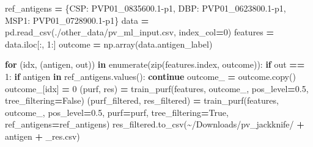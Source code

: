 \documentclass[
  11pt,
  oneside]{book}
\newenvironment{Shaded}{\begin{snugshade}}{\end{snugshade}}
\newcommand{\BuiltInTok}[1]{#1}
\newcommand{\ControlFlowTok}[1]{\textcolor[rgb]{0.13,0.29,0.53}{\textbf{#1}}}
\newcommand{\DecValTok}[1]{\textcolor[rgb]{0.00,0.00,0.81}{#1}}
\newcommand{\FloatTok}[1]{\textcolor[rgb]{0.00,0.00,0.81}{#1}}
\newcommand{\KeywordTok}[1]{\textcolor[rgb]{0.13,0.29,0.53}{\textbf{#1}}}
\newcommand{\NormalTok}[1]{#1}
\newcommand{\OperatorTok}[1]{\textcolor[rgb]{0.81,0.36,0.00}{\textbf{#1}}}
\newcommand{\StringTok}[1]{\textcolor[rgb]{0.31,0.60,0.02}{#1}}
\newcommand{\VariableTok}[1]{\textcolor[rgb]{0.00,0.00,0.00}{#1}}
\begin{document}
\begin{Shaded}
\begin{Highlighting}[]
\NormalTok{ref\_antigens }\OperatorTok{=}\NormalTok{ \{}\StringTok{\textquotesingle{}CSP\textquotesingle{}}\NormalTok{: }\StringTok{\textquotesingle{}PVP01\_0835600.1{-}p1\textquotesingle{}}\NormalTok{, }\StringTok{\textquotesingle{}DBP\textquotesingle{}}\NormalTok{: }\StringTok{\textquotesingle{}PVP01\_0623800.1{-}p1\textquotesingle{}}\NormalTok{, }\StringTok{\textquotesingle{}MSP1\textquotesingle{}}\NormalTok{: }\StringTok{\textquotesingle{}PVP01\_0728900.1{-}p1\textquotesingle{}}\NormalTok{\}}
\NormalTok{data }\OperatorTok{=}\NormalTok{ pd.read\_csv(}\StringTok{\textquotesingle{}./other\_data/pv\_ml\_input.csv\textquotesingle{}}\NormalTok{, index\_col}\OperatorTok{=}\DecValTok{0}\NormalTok{)}
\NormalTok{features }\OperatorTok{=}\NormalTok{ data.iloc[:, }\DecValTok{1}\NormalTok{:]}
\NormalTok{outcome }\OperatorTok{=}\NormalTok{ np.array(data.antigen\_label)}

\ControlFlowTok{for}\NormalTok{ (idx, (antigen, out)) }\KeywordTok{in} \BuiltInTok{enumerate}\NormalTok{(}\BuiltInTok{zip}\NormalTok{(features.index, outcome)):}
    \ControlFlowTok{if}\NormalTok{ out }\OperatorTok{==} \DecValTok{1}\NormalTok{:}
        \ControlFlowTok{if}\NormalTok{ antigen }\KeywordTok{in}\NormalTok{ ref\_antigens.values():}
            \ControlFlowTok{continue}
\NormalTok{        outcome\_ }\OperatorTok{=}\NormalTok{ outcome.copy()}
\NormalTok{        outcome\_[idx] }\OperatorTok{=} \DecValTok{0}
\NormalTok{        (purf, res) }\OperatorTok{=}\NormalTok{ train\_purf(features, outcome\_, pos\_level}\OperatorTok{=}\FloatTok{0.5}\NormalTok{, tree\_filtering}\OperatorTok{=}\VariableTok{False}\NormalTok{)}
\NormalTok{        (purf\_filtered, res\_filtered) }\OperatorTok{=}\NormalTok{ train\_purf(features, outcome\_, pos\_level}\OperatorTok{=}\FloatTok{0.5}\NormalTok{, purf}\OperatorTok{=}\NormalTok{purf, tree\_filtering}\OperatorTok{=}\VariableTok{True}\NormalTok{, ref\_antigens}\OperatorTok{=}\NormalTok{ref\_antigens)}
\NormalTok{        res\_filtered.to\_csv(}\StringTok{\textquotesingle{}\textasciitilde{}/Downloads/pv\_jackknife/\textquotesingle{}} \OperatorTok{+}\NormalTok{ antigen }\OperatorTok{+} \StringTok{\textquotesingle{}\_res.csv\textquotesingle{}}\NormalTok{)}
\end{Highlighting}
\end{Shaded}
\end{document}
